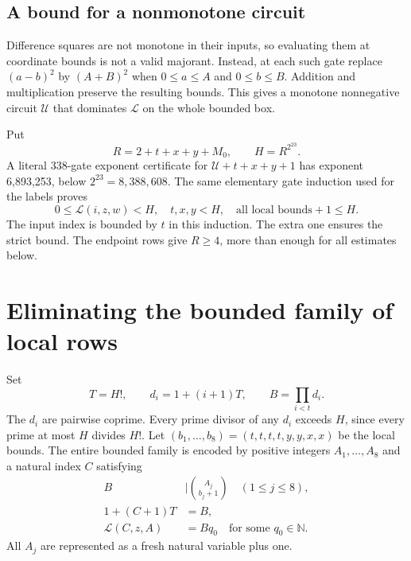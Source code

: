 \documentclass[10pt,letterpaper]{article}
\theoremstyle{definition}\newtheorem{definition}[theorem]{Definition}
\theoremstyle{remark}\newtheorem{remark}[theorem]{Remark}
\newcommand{\N}{\mathbb N}\newcommand{\Z}{\mathbb Z}\newcommand{\Q}{\mathbb Q}
\begin{document}
\subsection{A bound for a nonmonotone circuit}

Difference squares are not monotone in their inputs, so evaluating them
at coordinate bounds is not a valid majorant. Instead, at each such gate
replace $(a-b)^2$ by $(A+B)^2$ when $0\le a\le A$ and $0\le b\le B$.
Addition and multiplication preserve the resulting bounds. This gives a
monotone nonnegative circuit $\mathcal U$ that dominates $\mathcal L$
on the whole bounded box.

Put
\begin{equation}\label{eq:H}
 R=2+t+x+y+M_0,\qquad H=R^{2^{23}}.
\end{equation}
A literal 338-gate exponent certificate for
$\mathcal U+t+x+y+1$ has exponent 6,893,253, below $2^{23}=8,388,608$.
The same elementary gate induction used for the labels proves
\begin{equation}\label{eq:strictH}
 0\le\mathcal L(i,z,w)<H,
 \quad t,x,y<H,
 \quad\text{all local bounds}+1\le H.
\end{equation}
The input index is bounded by $t$ in this induction. The extra one
ensures the strict bound. The endpoint rows give $R\ge4$, more than
enough for all estimates below.

\section{Eliminating the bounded family of local rows}
\label{sec:CRT}

Set
\[
 T=H!,\qquad d_i=1+(i+1)T,\qquad B=\prod_{i<t}d_i.
\]
The $d_i$ are pairwise coprime. Every prime divisor of any $d_i$ exceeds
$H$, since every prime at most $H$ divides $H!$.
Let $(b_1,\ldots,b_8)=(t,t,t,t,y,y,x,x)$ be the local bounds.
The entire bounded family is encoded by positive integers
$A_1,\ldots,A_8$ and a natural index $C$ satisfying
\begin{align}
 B&\mid\binom{A_j}{b_j+1}\quad(1\le j\le8),\label{eq:ranges}\\
 1+(C+1)T&=B,\label{eq:canonical}\\
 \mathcal L(C,z,A)&=Bq_0\quad\text{for some }q_0\in\N.\label{eq:localmod}
\end{align}
All $A_j$ are represented as a fresh natural variable plus one.
\end{document}

